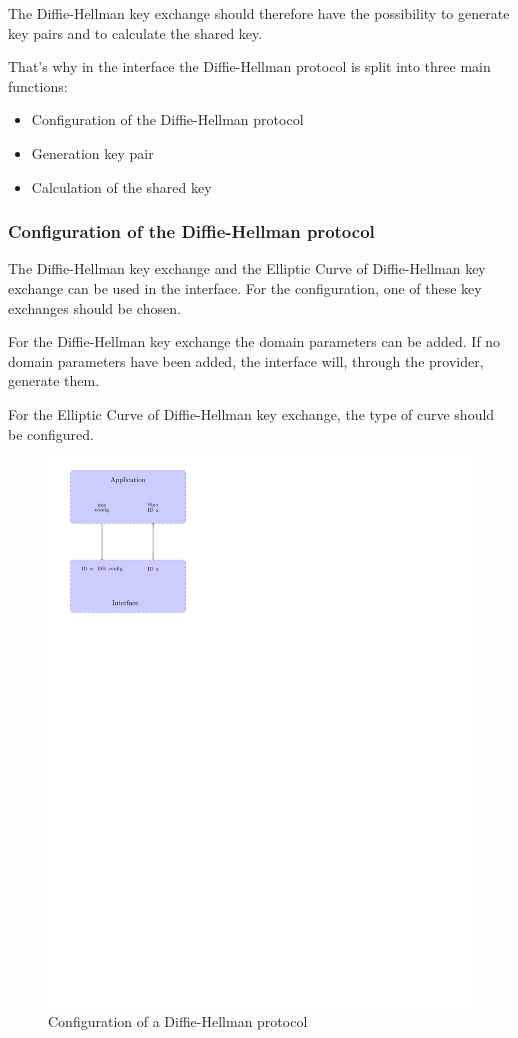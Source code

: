 The Diffie-Hellman key exchange should therefore have the possibility to
generate key pairs and to calculate the shared key.

That's why in the interface the Diffie-Hellman protocol is split into three main
functions:
\begin{itemize}[noitemsep]
  \item Configuration of the Diffie-Hellman protocol
  \item Generation key pair
  \item Calculation of the shared key
\end{itemize}


\subsubsection*{Configuration of the Diffie-Hellman protocol}
The Diffie-Hellman key exchange and the Elliptic Curve of Diffie-Hellman key
exchange can be used in the interface.
For the configuration, one of these key exchanges should be chosen.

For the Diffie-Hellman key exchange the domain parameters can be added. If no
domain parameters have been added, the interface will, through the provider,
generate them.

For the Elliptic Curve of Diffie-Hellman key exchange, the type of curve should
be configured.

\begin{figure}[!ht]
\centering
\includegraphics[trim=0cm 20cm 13.5cm 0cm]{figures/gci_dh_config.pdf}
\caption{Configuration of a Diffie-Hellman protocol}
\label{fig:gci_dh_config}
\end{figure}


